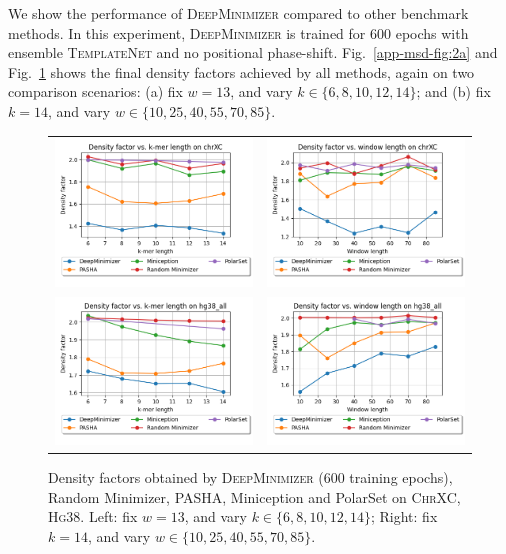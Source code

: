 \noindent We show the performance of \textsc{DeepMinimizer} compared to other benchmark methods. In this experiment, \textsc{DeepMinimizer} is trained for $600$ epochs with ensemble \textsc{TemplateNet} and no positional phase-shift. Fig.~\ref{app-msd-fig:2a} and Fig.~\ref{app-msd-fig:2b} shows the final density factors achieved by all methods, again on two comparison scenarios: (a) fix $w=13$, and vary $k \in \{6,8,10,12,14\}$; and (b) fix $k=14$, and vary $w \in \{10, 25, 40, 55, 70, 85\}$. 
\begin{figure}[h]
\begin{tabular}{cc}
\includegraphics[width=0.46\columnwidth]{minimizer_plots/compare_k_chrXC.png} &
\includegraphics[width=0.46\columnwidth]{minimizer_plots/compare_w_chrXC.png} \\
\includegraphics[width=0.46\columnwidth]{minimizer_plots/compare_k_hg38_all.png} &
\includegraphics[width=0.46\columnwidth]{minimizer_plots/compare_w_hg38_all.png}
\end{tabular}    
\caption{Density factors obtained by \textsc{DeepMinimizer} (600 training epochs), Random Minimizer, PASHA, Miniception and PolarSet on \textsc{ChrXC}, \textsc{Hg38}. Left: fix $w=13$, and vary $k \in \{6,8,10,12,14\}$; Right: fix $k=14$, and vary $w \in \{10, 25, 40, 55, 70, 85\}$.}
\label{app-msd-fig:2b}
\end{figure}
